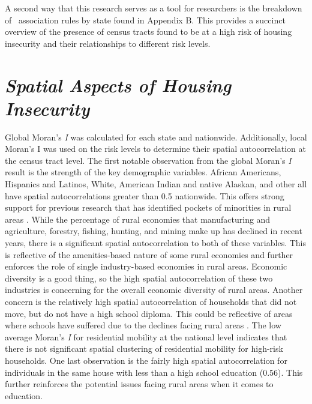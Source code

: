 A second way that this research serves as a tool for researchers is the breakdown of \hhr~association rules by state found in Appendix B. This provides a succinct overview of the presence of census tracts found to be at a high risk of housing insecurity and their relationships to different risk levels. 



\section{\textit{Spatial Aspects of Housing Insecurity}}

Global Moran's \textit{I} was calculated for each state and nationwide. Additionally, local Moran's I was used on the risk levels to determine their spatial autocorrelation at the census tract level. The first notable observation from the global Moran's \textit{I} result is the strength of the key demographic variables. African Americans, Hispanics and Latinos, White, American Indian and native Alaskan, and other all have spatial autocorrelations greater than 0.5 nationwide. This offers strong support for previous research that has identified pockets of minorities in rural areas \citep{lichter_demographic_2020}.  While the percentage of rural economies that manufacturing and agriculture, forestry, fishing, hunting, and mining make up has declined in recent years, there is a significant spatial autocorrelation to both of these variables. This is reflective of the amenities-based nature of some rural economies and further enforces the role of single industry-based economies in rural areas. Economic diversity is a good thing, so the high spatial autocorrelation of these two industries is concerning for the overall economic diversity of rural areas. Another concern is the relatively high spatial autocorrelation of households that did not move, but do not have a high school diploma. This could be reflective of areas where schools have suffered due to the declines facing rural areas \citep{blank_poverty_2005}. The low average Moran's \textit{I} for residential mobility at the national level indicates that there is not significant spatial clustering of residential mobility for high-risk households. One last observation is the fairly high spatial autocorrelation for individuals in the same house with less than a high school education (0.56). This further reinforces the potential issues facing rural areas when it comes to education.

